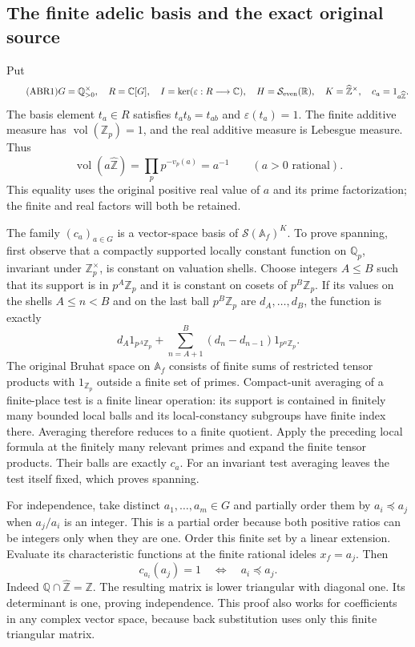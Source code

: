 \documentclass[11pt]{article}
\begin{document}
\subsection{The finite adelic basis and the exact original source}

Put
\begin{equation}\tag{ABR1}
 G=\mathbb Q_{>0}^{\times},\quad R=\mathbb C[G],\quad
 I=\ker(\varepsilon:R\longrightarrow\mathbb C),\quad
 H=\mathcal S_{\rm even}(\mathbb R),\quad
 K=\widehat{\mathbb Z}^{\times},\quad c_a=1_{a\widehat{\mathbb Z}}.
\end{equation}
The basis element $t_a\in R$ satisfies $t_at_b=t_{ab}$ and
$\varepsilon(t_a)=1$. The finite additive measure has
$\operatorname{vol}(\mathbb Z_p)=1$, and the real additive measure
is Lebesgue measure. Thus
\begin{equation}\tag{ABR2}
 \operatorname{vol}(a\widehat{\mathbb Z})
  =\prod_p p^{-v_p(a)}=a^{-1}\qquad(a>0\text{ rational}).
\end{equation}
This equality uses the original positive real value of $a$ and its
prime factorization; the finite and real factors will both be retained.

The family $(c_a)_{a\in G}$ is a vector-space basis of
$\mathcal S(\mathbb A_f)^K$. To prove spanning, first observe that a
compactly supported locally constant function on $\mathbb Q_p$,
invariant under $\mathbb Z_p^\times$, is constant on valuation shells.
Choose integers $A\le B$ such that its support is in $p^A\mathbb Z_p$
and it is constant on cosets of $p^B\mathbb Z_p$. If its values on
the shells $A\le n<B$ and on the last ball $p^B\mathbb Z_p$ are
$d_A,\ldots,d_B$, the function is exactly
\[
 d_A1_{p^A\mathbb Z_p}
 +\sum_{n=A+1}^{B}(d_n-d_{n-1})1_{p^n\mathbb Z_p}.
\]
The original Bruhat space on $\mathbb A_f$ consists of finite sums
of restricted tensor products with $1_{\mathbb Z_p}$ outside a finite
set of primes. Compact-unit averaging of a finite-place test is a
finite linear operation: its support is contained in finitely many
bounded local balls and its local-constancy subgroups have finite
index there. Averaging therefore reduces to a finite quotient. Apply
the preceding local formula at the finitely many relevant primes and
expand the finite tensor products. Their balls are exactly $c_a$.
For an invariant test averaging leaves the test itself fixed, which
proves spanning.

For independence, take distinct $a_1,\ldots,a_m\in G$ and partially
order them by $a_i\preceq a_j$ when $a_j/a_i$ is an integer. This is
a partial order because both positive ratios can be integers only
when they are one. Order this finite set by a linear extension.
Evaluate its characteristic functions at the finite rational ideles
$x_f=a_j$. Then
\[
 c_{a_i}(a_j)=1\quad\Longleftrightarrow\quad a_i\preceq a_j.
\]
Indeed $\mathbb Q\cap\widehat{\mathbb Z}=\mathbb Z$.
The resulting matrix is lower triangular with diagonal one. Its
determinant is one, proving independence. This proof also works for
coefficients in any complex vector space, because back substitution
uses only this finite triangular matrix.
\end{document}
